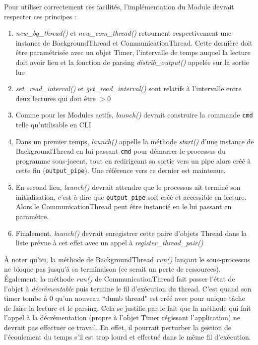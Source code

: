 \documentclass[]{article}
\begin{document}
Pour utiliser correctement ces facilités, l'implémentation du Module devrait respecter ces principes :
\begin{enumerate}
\item \textit{new\_bg\_thread()} et \textit{new\_com\_thread()} retournent respectivement une instance de BackgroundThread et CommunicationThread. Cette dernière doit être paramétrisée avec un objet Timer, l'intervalle de temps auquel la lecture doit avoir lieu et la fonction de parsing \textit{distrib\_output()} appelée sur la sortie lue
\vspace{0.2cm}
\item \textit{set\_read\_interval()} et \textit{get\_read\_interval()} sont relatifs à l'intervalle entre deux lectures qui doit être $> 0$
\vspace{0.2cm}
\item Comme pour les Modules actifs, \textit{launch()} devrait construire la commande \texttt{cmd} telle qu'utilisable en CLI
\vspace{0.2cm}
\item Dans un premier temps, \textit{launch()} appelle la méthode \textit{start()} d'une instance de BackgroundThread en lui passant \texttt{cmd} pour démarrer le processus du programme sous-jacent, tout en redirigeant sa sortie vers un pipe alors créé à cette fin (\texttt{output\_pipe}). Une référence vers ce dernier est maintenue.
\vspace{0.2cm}
\item En second lieu, \textit{launch()} devrait attendre que le processus ait terminé son initialisation, c'est-à-dire que \texttt{output\_pipe} soit créé et accessible en lecture. Alors le CommunicationThread peut être instancié en le lui passant en paramètre.
\vspace{0.2cm}
\item Finalement, \textit{launch()} devrait enregistrer cette paire d'objets Thread dans la liste prévue à cet effet avec un appel à \textit{register\_thread\_pair()}
\end{enumerate}

\vspace{0.2cm}

À noter qu'ici, la méthode de BackgroundThread \textit{run()} lançant le sous-processus ne bloque pas jusqu'à sa terminaison (ce serait un perte de ressources). Également, la méthode \textit{run()} de CommunicationThread fait passer l'état de l'objet à \textit{décrémentable} puis termine le fil d'exécution du thread. C'est quand son timer tombe à 0 qu'un nouveau ``dumb thread" est créé avec pour unique tâche de faire la lecture et le parsing. Cela se justifie par le fait que la méthode qui fait l'appel à la décrémentation (propre à l'objet Timer régissant l'application) ne devrait pas effectuer ce travail. En effet, il pourrait perturber la gestion de l'écoulement du temps s'il est trop lourd et effectué dans le même fil d'exécution. 
\newpage
\end{document}
